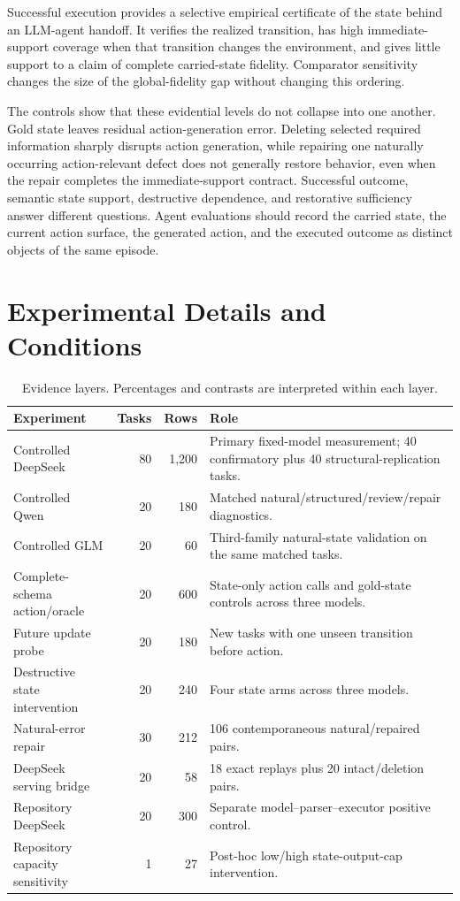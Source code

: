\documentclass[11pt]{article}
\begin{document}
Successful execution provides a selective empirical certificate of the state behind an LLM-agent handoff. It verifies the realized transition, has high immediate-support coverage when that transition changes the environment, and gives little support to a claim of complete carried-state fidelity. Comparator sensitivity changes the size of the global-fidelity gap without changing this ordering.

The controls show that these evidential levels do not collapse into one another. Gold state leaves residual action-generation error. Deleting selected required information sharply disrupts action generation, while repairing one naturally occurring action-relevant defect does not generally restore behavior, even when the repair completes the immediate-support contract. Successful outcome, semantic state support, destructive dependence, and restorative sufficiency answer different questions. Agent evaluations should record the carried state, the current action surface, the generated action, and the executed outcome as distinct objects of the same episode.

\clearpage
\appendix

\section{Experimental Details and Conditions}
\label{app:design}

\begin{table}[h]
\centering
\caption{Evidence layers. Percentages and contrasts are interpreted within each layer.}
\label{tab:evidence_layers}
\small
\begin{tabularx}{\linewidth}{@{}lrrY@{}}
\toprule
Experiment & Tasks & Rows & Role \\
\midrule
Controlled DeepSeek & 80 & 1,200 & Primary fixed-model measurement; 40 confirmatory plus 40 structural-replication tasks. \\
Controlled Qwen & 20 & 180 & Matched natural/structured/review/repair diagnostics. \\
Controlled GLM & 20 & 60 & Third-family natural-state validation on the same matched tasks. \\
Complete-schema action/oracle & 20 & 600 & State-only action calls and gold-state controls across three models. \\
Future update probe & 20 & 180 & New tasks with one unseen transition before action. \\
Destructive state intervention & 20 & 240 & Four state arms across three models. \\
Natural-error repair & 30 & 212 & 106 contemporaneous natural/repaired pairs. \\
DeepSeek serving bridge & 20 & 58 & 18 exact replays plus 20 intact/deletion pairs. \\
Repository DeepSeek & 20 & 300 & Separate model--parser--executor positive control. \\
Repository capacity sensitivity & 1 & 27 & Post-hoc low/high state-output-cap intervention. \\
\bottomrule
\end{tabularx}
\end{table}
\end{document}
